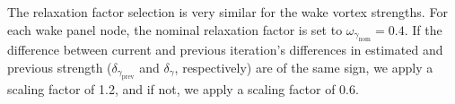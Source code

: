 









The relaxation factor selection is very similar for the wake vortex strengths.
%
For each wake panel node, the nominal relaxation factor is set to \(\omega_{\gamma_\text{nom}} = 0.4\).
%
If the difference between current and previous iteration's differences in estimated and previous strength (\(\delta_{\gamma_\text{prev}}\) and \(\delta_\gamma\), respectively) are of the same sign, we apply a scaling factor of 1.2, and if not, we apply a scaling factor of 0.6.

